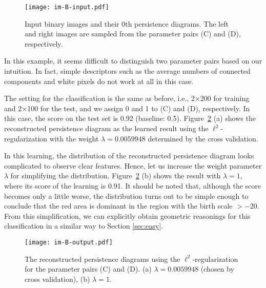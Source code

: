 \documentclass[smallextended]{svjour3}
\begin{document}
\begin{figure}[htbp]
  \centering
  \texttt{[image: im-B-input.pdf]}
  \caption{Input binary images and their 0th persistence diagrams. The left and right images are sampled from the parameter pairs (C) and (D), respectively. }
  \label{fig:input_im_B}
\end{figure}

In this example, it seems difficult to distinguish two parameter pairs based on our intuition. In fact, simple descriptors such as 
the average numbers of connected components and white pixels do not work at all in this case. 


The setting for the classification is the same as before, i.e., 2$\times$200 for training and 2$\times$100 for the test, and we assign 0 and 1 to (C) and (D), respectively. In this case, the score on the test set is 0.92 (baseline: 0.5). Figure~\ref{fig:output_im_B} (a) shows the reconstructed persistence diagram as the learned result using the $\ell^2$-regularization with the weight $\lambda = 0.0059948$ determined by the cross validation. 

In this learning, the distribution of the reconstructed persistence diagram looks complicated to observe clear features. Hence, let us increase  the weight parameter $\lambda$  for simplifying the distribution. 
Figure~\ref{fig:output_im_B} (b) shows the result with $\lambda=1$, where its score of the learning is 0.91. It should be noted that, although the score becomes only a little worse, the distribution turns out to be simple enough to conclude that the red area is dominant in the region with the birth scale $>-20$. From this simplification, we can explicitly obtain geometric reasonings for this classification in a similar way to Section \ref{sec:easy}.
 

\begin{figure}[htbp]
  \centering
  \texttt{[image: im-B-output.pdf]}
  \caption{The reconstructed persistence diagrams using the $\ell^2$-regularization for the parameter pairs (C) and (D). (a) $\lambda = 0.0059948$ (chosen by cross validation), (b) $\lambda=1$.
  }
  \label{fig:output_im_B}
\end{figure}
\end{document}
